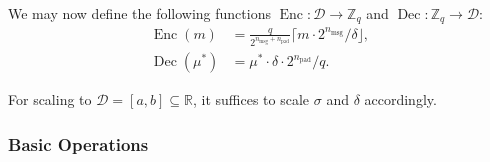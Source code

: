 \documentclass{article}
\DeclareMathOperator{\enc}{Enc}
\DeclareMathOperator{\dec}{Dec}
\begin{document}
We may now define the following functions $\enc: \mathscr{D} \to \mathbb{Z}_q$ and
$\dec: \mathbb{Z}_q \to \mathscr{D}$: \begin{align}
  \enc(m) &= \frac{q}{2^{n_{\text{msg}} + n_{\text{pad}}}}
  \lceil m \cdot 2^{n_{\text{msg}}} / \delta \rfloor, \\
  \dec(\mu^*) &= \mu^* \cdot \delta \cdot 2^{n_{\text{pad}}}/q.
\end{align}

For scaling to $\mathscr{D} = [a, b] \subseteq \mathbb{R}$, it suffices to scale
$\sigma$ and $\delta$ accordingly.

\subsubsection{Basic Operations}



\printbibliography
\end{document}

